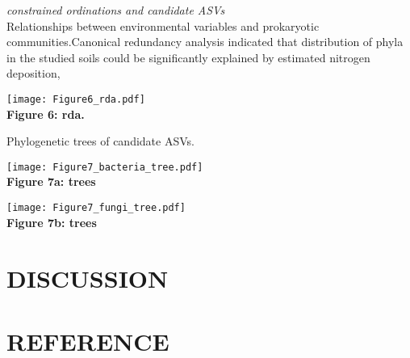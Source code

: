 \documentclass[11pt,]{article}
\begin{document}
\emph{constrained ordinations and candidate ASVs}\\
Relationships between environmental variables and prokaryotic
communities.Canonical redundancy analysis indicated that distribution of
phyla in the studied soils could be significantly explained by estimated
nitrogen deposition,

\texttt{[image: Figure6\_rda.pdf]}\\
\textbf{Figure 6: rda.}

Phylogenetic trees of candidate ASVs.

\texttt{[image: Figure7\_bacteria\_tree.pdf]}\\
\textbf{Figure 7a: trees}

\texttt{[image: Figure7\_fungi\_tree.pdf]}\\
\textbf{Figure 7b: trees}

\newpage  

\section{DISCUSSION}\label{discussion}

\newpage  

\section{REFERENCE}\label{reference}
\end{document}
